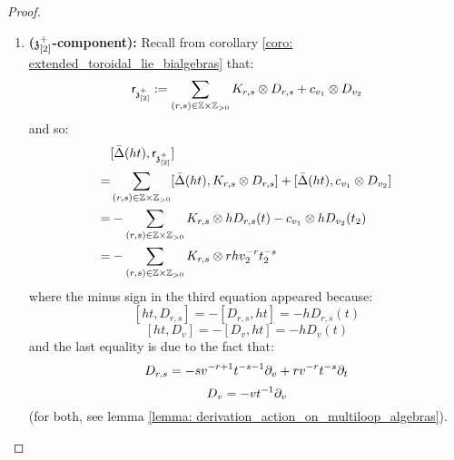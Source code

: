 \begin{proof}
\begin{enumerate}
\begin{enumerate}
                        \item \textbf{($\mathfrak{z}_{[2]}^{+}$-component):} Recall from corollary \ref{coro: extended_toroidal_lie_bialgebras} that:
                            $$\sfr_{\z_{[2]}^{\positive}} := \sum_{(r, s) \in \Z \x \Z_{> 0}} K_{r, s} \tensor D_{r, s} + c_{v_1} \tensor D_{v_2}$$
                        and so:
                            $$
                                \begin{aligned}
                                    & [\bar{\Delta}(ht), \sfr_{\z_{[2]}^{\positive}}]
                                    \\
                                    = & \sum_{(r, s) \in \Z \x \Z_{> 0}} [\bar{\Delta}(ht), K_{r, s} \tensor D_{r, s}] + [\bar{\Delta}(ht), c_{v_1} \tensor D_{v_2}]
                                    \\
                                    = & -\sum_{(r, s) \in \Z \x \Z_{> 0}} K_{r, s} \tensor h D_{r, s}(t) - c_{v_1} \tensor h D_{v_2}(t_2)
                                    \\
                                    = & -\sum_{(r, s) \in \Z \x \Z_{> 0}} K_{r, s} \tensor r h v_2^{-r} t_2^{-s}
                                \end{aligned}
                            $$
                        where the minus sign in the third equation appeared because:
                            $$[ht, D_{r, s}] = -[D_{r, s}, ht] = -h D_{r, s}(t)$$
                            $$[ht, D_v] = -[D_v, ht] = -h D_v(t)$$
                        and the last equality is due to the fact that:
                            $$D_{r, s} = -s v^{-r + 1} t^{-s - 1} \partial_v + r v^{-r} t^{-s} \partial_t$$
                            $$D_v = -v t^{-1} \partial_v$$
                        (for both, see lemma \ref{lemma: derivation_action_on_multiloop_algebras}). 
                        

\end{enumerate}
\end{enumerate}
\end{proof}
